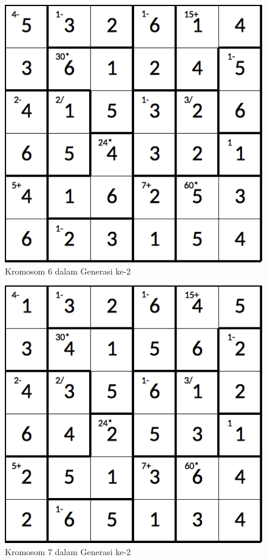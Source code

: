 \documentclass[a4paper,twoside]{article}
\begin{document}
\begin{enumerate}
\begin{figure}
\centering
\captionsetup{justification=centering}
\includegraphics[scale=0.333]{Gambar/hybridgenetic/Generation2Chromosome6}
\caption[Kromosom 6 dalam Generasi ke-2]{Kromosom 6 dalam Generasi ke-2}
\label{fig:analisisg2k6}
\end{figure}

\begin{figure}
\centering
\captionsetup{justification=centering}
\includegraphics[scale=0.333]{Gambar/hybridgenetic/Generation2Chromosome7}
\caption[Kromosom 7 dalam Generasi ke-2]{Kromosom 7 dalam Generasi ke-2}
\label{fig:analisisg2k7}
\end{figure}


\end{enumerate}
\end{document}
